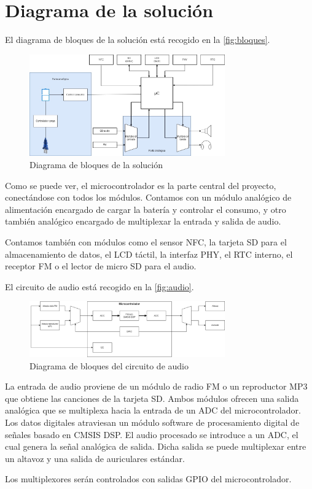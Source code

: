 \section{Diagrama de la solución}

El diagrama de bloques de la solución está recogido en la \autoref{fig:bloques}.

\begin{figure}[h]
    \centering
    \includegraphics[width=0.75\textwidth]{images/bloques.jpg}
    \caption{Diagrama de bloques de la solución}
    \label{fig:bloques}
\end{figure}

Como se puede ver, el microcontrolador es la parte central del proyecto, conectándose con todos los módulos. Contamos con un módulo analógico de alimentación encargado de cargar la batería y controlar el consumo, y otro también analógico encargado de multiplexar la entrada y salida de audio.

Contamos también con módulos como el sensor NFC, la tarjeta SD para el almacenamiento de datos, el LCD táctil, la interfaz PHY, el RTC interno, el receptor FM o el lector de micro SD para el audio.

El circuito de audio está recogido en la \autoref{fig:audio}.

\begin{figure}[h]
    \centering
    \includegraphics[width=0.75\textwidth]{images/flujoAudio.png}
    \caption{Diagrama de bloques del circuito de audio}
    \label{fig:audio}
\end{figure}

La entrada de audio proviene de un módulo de radio FM o un reproductor MP3 que obtiene las canciones de la tarjeta SD. Ambos módulos ofrecen una salida analógica que se multiplexa hacia la entrada de un ADC del microcontrolador. Los datos digitales atraviesan un módulo software de procesamiento digital de señales basado en CMSIS DSP. El audio procesado se introduce a un ADC, el cual genera la señal analógica de salida. Dicha salida se puede multiplexar entre un altavoz y una salida de auriculares estándar.

Los multiplexores serán controlados con salidas GPIO del microcontrolador.